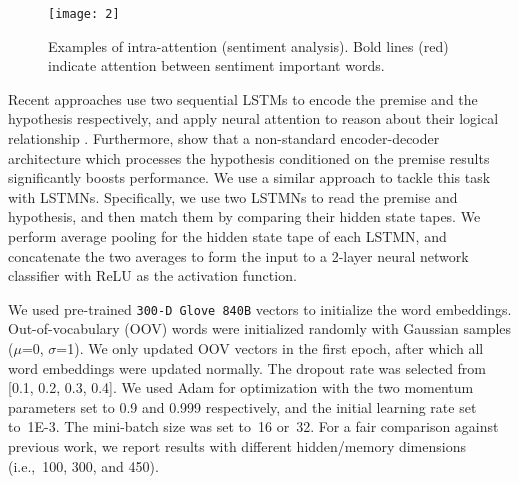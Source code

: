 \documentclass[11pt,letterpaper]{article}
\begin{document}
	\begin{figure}[t]
		\begin{center}
			\texttt{[image: 2]}
		\end{center}
		\caption{\label{sa} Examples of intra-attention
			(sentiment analysis). Bold lines (red) indicate
			attention between sentiment important words.}
\end{figure}
	
	
	Recent approaches use two sequential LSTMs to encode the
        premise and the hypothesis respectively, and apply neural
        attention to reason about their logical relationship
        \cite{rocktaschel2015reasoning,wang2015learning}. Furthermore,
         show that a non-standard
        encoder-decoder architecture which processes the hypothesis
        conditioned on the premise results significantly boosts
        performance.  We use a similar approach to tackle this task
        with LSTMNs.  Specifically, we use two LSTMNs to read the
        premise and hypothesis, and then match them by comparing their
        hidden state tapes. We perform average pooling for the hidden
        state tape of each LSTMN, and concatenate the two averages to
        form the input to a 2-layer neural network classifier with
        ReLU as the activation function.
	
	
	We used pre-trained \texttt{300-D Glove 840B} vectors
        \cite{pennington2014glove} to initialize the word
        embeddings. Out-of-vocabulary (OOV) words were initialized
        randomly with Gaussian samples ($\mu$=0, $\sigma$=1). We only
        updated OOV vectors in the first epoch, after which all word
        embeddings were updated normally.  The dropout rate was
        selected from [0.1, 0.2, 0.3, 0.4].  We used Adam
        \cite{kingma2014adam} for optimization with the two momentum
        parameters set to 0.9 and 0.999 respectively, and the initial
        learning rate set to~1E-3. The mini-batch size was set to~16
        or~32.  For a fair comparison against previous work, we report
        results with different hidden/memory dimensions (i.e.,~100,
        300, and 450).
	
\end{document}
